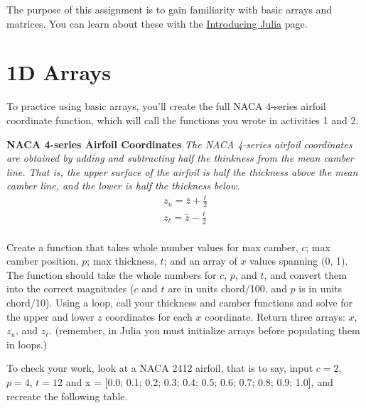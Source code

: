\documentclass{article}%
\begin{document}
The purpose of this assignment is to gain familiarity with basic arrays and matrices. You can learn about these with the \href{https://en.wikibooks.org/wiki/Introducing_Julia/Arrays_and_tuples}{Introducing Julia} page.

\section{1D Arrays}
To practice using basic arrays, you'll create the full NACA 4-series airfoil coordinate function, which will call the functions you wrote in activities 1 and 2.

\bigskip

\begin{tcolorbox}
	\textbf{
		NACA 4-series Airfoil Coordinates}
	\textit{
		The NACA 4-series airfoil coordinates are obtained by adding and subtracting half the thinkness from the mean camber line. That is, the upper surface of the airfoil is half the thickness above the mean camber line, and the lower is half the thickness below.
	}
	\begin{align*}
	z_u = \bar{z} + \frac{t}{2}\\
	z_\ell = \bar{z} - \frac{t}{2}\\
	\end{align*}
	
\end{tcolorbox}

\bigskip

Create a function that takes whole number values for max camber, $c$; max camber position, $p$; max thickness, $t$; and an array of $x$ values spanning (0, 1). The function should take the whole numbers for $c$, $p$, and $t$, and convert them into the correct magnitudes ($c$ and $t$ are in units chord/100, and $p$ is in units chord/10). Using a loop, call your thickness and camber functions and solve for the upper and lower $z$ coordinates for each $x$ coordinate. Return three arrays: $x$, $z_u$, and $z_\ell$. (remember, in Julia you must initialize arrays before populating them in loops.)

To check your work, look at a NACA 2412 airfoil, that is to say, input $c=2$, $p=4$, $t=12$ and x = [0.0; 0.1; 0.2; 0.3; 0.4; 0.5; 0.6; 0.7; 0.8; 0.9; 1.0], and recreate the following table.

\bigskip
\end{document}
